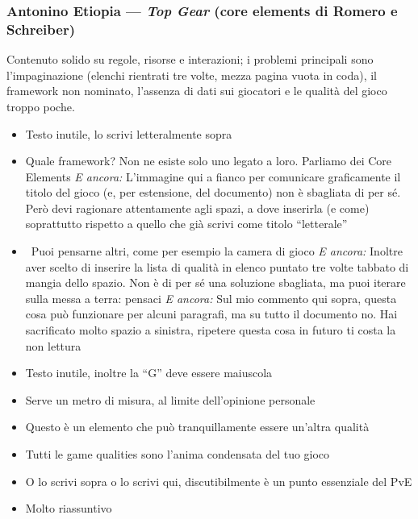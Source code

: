 \subsubsection{Antonino Etiopia --- \emph{Top Gear} (core elements di Romero e
Schreiber)}
Contenuto solido su regole, risorse e interazioni; i problemi principali sono
l'impaginazione (elenchi rientrati tre volte, mezza pagina vuota in coda), il
framework non nominato, l'assenza di dati sui giocatori e le qualità del gioco
troppo poche.
{\small
\begin{itemize}
  \item {} Testo inutile, lo scrivi letteralmente sopra
  \item {} Quale framework? Non ne esiste solo uno legato a loro. Parliamo dei Core Elements \emph{E ancora:} L'immagine qui a fianco per comunicare graficamente il titolo del gioco (e, per estensione, del documento) non è sbagliata di per sé. Però devi ragionare attentamente agli spazi, a dove inserirla (e come) soprattutto rispetto a quello che già scrivi come titolo ``letterale''
  \item {} \rvAvviso\ Puoi pensarne altri, come per esempio la camera di gioco \emph{E ancora:} Inoltre aver scelto di inserire la lista di qualità in elenco puntato tre volte tabbato di mangia dello spazio. Non è di per sé una soluzione sbagliata, ma puoi iterare sulla messa a terra: pensaci \emph{E ancora:} Sul mio commento qui sopra, questa cosa può funzionare per alcuni paragrafi, ma su tutto il documento no. Hai sacrificato molto spazio a sinistra, ripetere questa cosa in futuro ti costa la non lettura
  \item {} Testo inutile, inoltre la ``G'' deve essere maiuscola
  \item {} Serve un metro di misura, al limite dell'opinione personale
  \item {} Questo è un elemento che può tranquillamente essere un'altra qualità
  \item {} Tutti le game qualities sono l'anima condensata del tuo gioco
  \item {} O lo scrivi sopra o lo scrivi qui, discutibilmente è un punto essenziale del PvE
  \item {} Molto riassuntivo

\end{itemize}}
